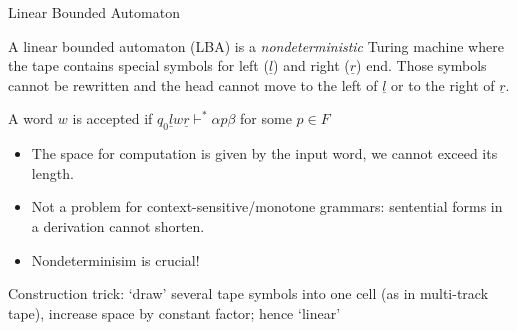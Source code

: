 \documentclass[handout]{beamer}
\begin{document}
\begin{frame}{Linear Bounded Automaton}    

    \begin{definition}
        A \alert{linear bounded automaton} (\alert{LBA}) is a \emph{nondeterministic} Turing machine where the tape contains special symbols for left ($\underline{l}$) and right ($\underline{r}$) end. Those symbols cannot be rewritten and the head cannot move to the left of $\underline{l}$ or to the right of $\underline{r}$. 

    A word $w$ is \alert{accepted} if $q_0\underline{l}w\underline{r}\vdash^*\alpha p\beta$ for some $p\in F$
    \end{definition}
    \begin{itemize}
        \item The space for computation is given by the input word, we cannot exceed its length.
        \item Not a problem for context-sensitive/monotone grammars: sentential forms in a derivation cannot shorten.
        \item Nondeterminisim is crucial!
    \end{itemize}

    \alert{Construction trick:} `draw' several tape symbols into one cell (as in multi-track tape), increase space by constant factor; hence `linear'

\end{frame}
\end{document}

